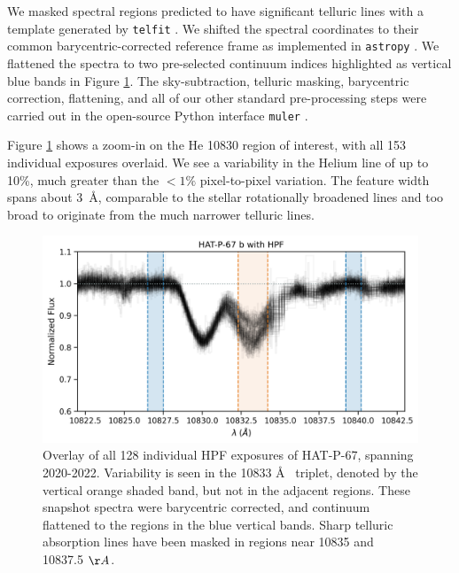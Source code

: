 \documentclass[twocolumn]{aastex631}
\begin{document}
We masked spectral regions predicted to have significant telluric lines with a template generated by \texttt{telfit} \citep{2014AJ....148...53G}.  We shifted the spectral coordinates to their common barycentric-corrected reference frame \citep{2014PASP..126..838W} as implemented in \texttt{astropy} \citep{2013A&A...558A..33A,2018AJ....156..123A,2022ApJ...935..167A}.  We flattened the spectra to two pre-selected continuum indices highlighted as vertical blue bands in Figure \ref{fig:HPFheliumOverview}.  The sky-subtraction, telluric masking, barycentric correction, flattening, and all of our other standard pre-processing steps were carried out in the open-source Python interface \texttt{muler} \citep{2022JOSS....7.4302G}.

Figure \ref{fig:HPFheliumOverview} shows a zoom-in on the He 10830 region of interest, with all 153 individual exposures overlaid.  We see a variability in the Helium line of up to 10\%, much greater than the $<1\%$ pixel-to-pixel variation.  The feature width spans about 3~\AA, comparable to the stellar rotationally broadened lines and too broad to originate from the much narrower telluric lines.

\begin{figure}
    \includegraphics[width=\linewidth]{figures/HAT_P_67b_He_spectrum.png}
    \caption{Overlay of all 128 individual HPF exposures of HAT-P-67, spanning 2020-2022. Variability is seen in the  10833 \AA~ triplet, denoted by the vertical orange shaded band, but not in the adjacent regions.  These snapshot spectra were barycentric corrected, and continuum flattened to the regions in the blue vertical bands.  Sharp telluric absorption lines have been masked in regions near 10835 and 10837.5 $\AA$.}
    \label{fig:HPFheliumOverview}
\end{figure}
\end{document}
